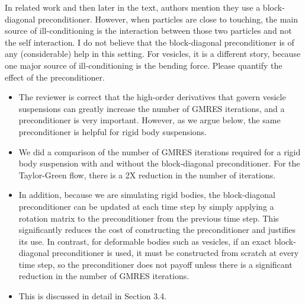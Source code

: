 \documentclass[11pt]{article}
\newcommand{\comment}[1]{{\color{blue} #1}}
\begin{document}
\noindent
\comment{In related work and then later in the text, authors mention
  they use a block-diagonal preconditioner. However, when particles are
  close to touching, the main source of ill-conditioning is the
  interaction between those two particles and not the self interaction.
  I do not believe that the block-diagonal preconditioner is of any
  (considerable) help in this setting.  For vesicles, it is a different
  story, because one major source of ill-conditioning is the bending
force.  Please quantify the effect of the preconditioner.}
\begin{itemize}
  \item The reviewer is correct that the high-order derivatives that
    govern vesicle suspensions can greatly increase the number of GMRES
    iterations, and a preconditioner is very important.  However, as we
    argue below, the same preconditioner is helpful for rigid body
    suspensions.

  \item We did a comparison of the number of GMRES iterations required
    for a rigid body suspension with and without the block-diagonal
    preconditioner.  For the Taylor-Green flow, there is a 2X reduction
    in the number of iterations.

  \item In addition, because we are simulating rigid bodies, the
    block-diagonal preconditioner can be updated at each time step by
    simply applying a rotation matrix to the preconditioner from the
    previous time step.  This significantly reduces the cost of
    constructing the preconditioner and justifies its use.  In contrast,
    for deformable bodies such as vesicles, if an exact block-diagonal
    preconditioner is used, it must be constructed from scratch at every
    time step, so the preconditioner does not payoff unless there is a
    significant reduction in the number of GMRES iterations.

  \item This is discussed in detail in Section 3.4.
\end{itemize}
\end{document}
